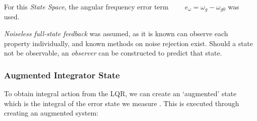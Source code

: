 %

For this \emph{State Space}, the angular frequency error term $\qquad e_{\omega} = \omega_{g} - \omega_{g0}$ was used.

\emph{Noiseless full-state feedback} was assumed, as it is known can observe each property individually, and known methods on noise rejection exist.
Should a state not be observable, an \emph{observer} can be constructed to predict that state.

\subsubsection{Augmented Integrator State}

To obtain integral action from the LQR, we can create an `augmented' state which is the integral of the error state we measure \cite{power:augstate}. This is executed through creating an augmented system:

